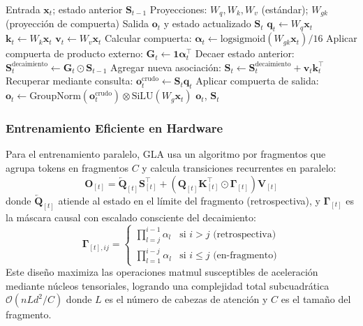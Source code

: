 \begin{algorithm}[H]
\caption{Atención Lineal con Compuerta (Forma Recurrente)}
\begin{algorithmic}[1]
\Require Entrada $\mathbf{x}_t$; estado anterior $\mathbf{S}_{t-1}$
\Require Proyecciones: $W_q, W_k, W_v$ (estándar); $W_{gk}$ (proyección de compuerta)
\Ensure Salida $\mathbf{o}_t$ y estado actualizado $\mathbf{S}_t$
\State $\mathbf{q}_t \gets W_q \mathbf{x}_t$
\State $\mathbf{k}_t \gets W_k \mathbf{x}_t$
\State $\mathbf{v}_t \gets W_v \mathbf{x}_t$
\State Calcular compuerta: $\boldsymbol{\alpha}_t \gets \text{logsigmoid}(W_{gk} \mathbf{x}_t) / 16$ 
\State Aplicar compuerta de producto externo: $\mathbf{G}_t \gets \mathbf{1} \boldsymbol{\alpha}_t^\top$  
\State Decaer estado anterior: $\mathbf{S}_t^\text{decaimiento} \gets \mathbf{G}_t \odot \mathbf{S}_{t-1}$ 
\State Agregar nueva asociación: $\mathbf{S}_t \gets \mathbf{S}_t^\text{decaimiento} + \mathbf{v}_t \mathbf{k}_t^\top$
\State Recuperar mediante consulta: $\mathbf{o}_t^\text{crudo} \gets \mathbf{S}_t \mathbf{q}_t$
\State Aplicar compuerta de salida: $\mathbf{o}_t \gets \text{GroupNorm}(\mathbf{o}_t^\text{crudo}) \otimes \text{SiLU}(W_g \mathbf{x}_t)$
\Return $\mathbf{o}_t$, $\mathbf{S}_t$
\end{algorithmic}
\end{algorithm}

\subsubsection{Entrenamiento Eficiente en Hardware}

Para el entrenamiento paralelo, GLA usa un algoritmo por fragmentos que agrupa tokens en fragmentos $C$ y calcula transiciones recurrentes en paralelo:
\[
\mathbf{O}_{[t]} = \overleftarrow{\mathbf{Q}}_{[t]} \mathbf{S}_{[t]}^\top + \left(\mathbf{Q}_{[t]} \mathbf{K}_{[t]}^\top \odot \mathbf{\Gamma}_{[t]}\right) \mathbf{V}_{[t]}
\]
donde $\overleftarrow{\mathbf{Q}}_{[t]}$ atiende al estado en el límite del fragmento (retrospectiva), y $\mathbf{\Gamma}_{[t]}$ es la máscara causal con escalado consciente del decaimiento:
\[
\mathbf{\Gamma}_{[t],ij} = \begin{cases} \prod_{l=j}^{i-1} \alpha_l & \text{si } i > j \text{ (retrospectiva)} \\ \prod_{l=1}^{i-j} \alpha_l & \text{si } i \le j \text{ (en-fragmento)} \end{cases}
\]
Este diseño maximiza las operaciones matmul susceptibles de aceleración mediante núcleos tensoriales, logrando una complejidad total subcuadrática $\mathcal{O}(nLd^2/C)$ donde $L$ es el número de cabezas de atención y $C$ es el tamaño del fragmento.

